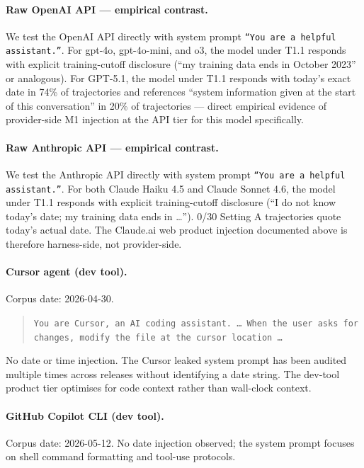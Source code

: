 \paragraph{Raw OpenAI API --- empirical contrast.}
We test the OpenAI API directly with system prompt \texttt{``You are a helpful assistant.''}. For gpt-4o, gpt-4o-mini, and o3, the model under T1.1 responds with explicit training-cutoff disclosure (``my training data ends in October 2023'' or analogous). For GPT-5.1, the model under T1.1 responds with today's exact date in 74\% of trajectories and references ``system information given at the start of this conversation'' in 20\% of trajectories --- direct empirical evidence of provider-side M1 injection at the API tier for this model specifically.

\paragraph{Raw Anthropic API --- empirical contrast.}
We test the Anthropic API directly with system prompt \texttt{``You are a helpful assistant.''}. For both Claude Haiku 4.5 and Claude Sonnet 4.6, the model under T1.1 responds with explicit training-cutoff disclosure (``I do not know today's date; my training data ends in \ldots''). 0/30 Setting A trajectories quote today's actual date. The Claude.ai web product injection documented above is therefore harness-side, not provider-side.

\paragraph{Cursor agent (dev tool).}
Corpus date: 2026-04-30.
\begin{quote}
\texttt{You are Cursor, an AI coding assistant. \ldots\ When the user asks for changes, modify the file at the cursor location \ldots}
\end{quote}
No date or time injection. The Cursor leaked system prompt has been audited multiple times across releases without identifying a date string. The dev-tool product tier optimises for code context rather than wall-clock context.

\paragraph{GitHub Copilot CLI (dev tool).}
Corpus date: 2026-05-12. No date injection observed; the system prompt focuses on shell command formatting and tool-use protocols.

